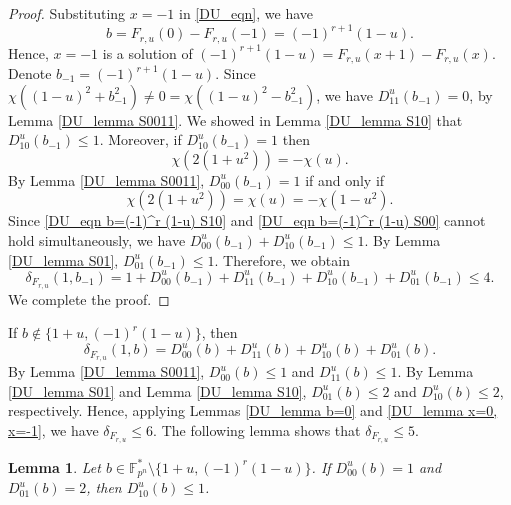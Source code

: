 \documentclass[11pt]{article}
\numberwithin{theorem}{section}
\newtheorem{lemma}[theorem]{Lemma}
\newcommand{\Fpnmul}{\mathbb{F}_{p^n}^*}
\begin{document}
\begin{proof}
	Substituting $x=-1$ in \eqref{DU_eqn}, we have
	\begin{equation*}
		b=F_{r,u}(0)-F_{r,u}(-1) = (-1)^{r+1}(1-u).
	\end{equation*}
	Hence, $x=-1$ is a solution of $(-1)^{r+1}(1-u) = F_{r,u}(x+1)-F_{r,u}(x)$. Denote $b_{-1} =(-1)^{r+1}(1-u)$. Since $\chi((1-u)^2+b_{-1}^2)\ne 0 =\chi((1-u)^2-b_{-1}^2)$, we have $D_{11}^u(b_{-1})=0$, by Lemma \ref{DU_lemma S0011}. 
	We showed in Lemma \ref{DU_lemma S10} that $D_{10}^u(b_{-1}) \le 1$. Moreover,  if $D_{10}^u(b_{-1})=1$ then 
	\begin{equation}\label{DU_eqn b=(-1)^r (1-u) S10}
		\chi(2(1+u^2))=-\chi(u).
	\end{equation}
	By Lemma \ref{DU_lemma S0011}, $D_{00}^u(b_{-1})=1$ if and only if 
	\begin{equation}\label{DU_eqn b=(-1)^r (1-u) S00}
		\chi(2(1+ u^2))=\chi(u)=-\chi(1-u^2).
	\end{equation}
	Since \eqref{DU_eqn b=(-1)^r (1-u) S10} and \eqref{DU_eqn b=(-1)^r (1-u) S00} cannot hold simultaneously, we have $D_{00}^u(b_{-1})+D_{10}^u(b_{-1})\le 1$. By Lemma \ref{DU_lemma S01}, $D_{01}^u(b_{-1})\le 1$. 
	Therefore, we obtain 
	\begin{equation*}
		\delta_{F_{r,u}}(1,b_{-1})=1+D_{00}^u(b_{-1}) + D_{11}^u(b_{-1})
		+D_{10}^u(b_{-1})+D_{01}^u(b_{-1})\le 4.
	\end{equation*}
	We complete the proof.
\end{proof}

If $b\not \in \{1+u, (-1)^r(1-u)\}$, then 
\begin{equation}\label{DU_formula}
	\delta_{F_{r,u}}(1,b)=D_{00}^u(b)+D_{11}^u(b)+D_{10}^u(b)+D_{01}^u(b).
\end{equation}
By Lemma \ref{DU_lemma S0011}, $D_{00}^u(b)\le 1$ and $D_{11}^u(b)\le 1$. By Lemma \ref{DU_lemma S01} and Lemma \ref{DU_lemma S10}, $D_{01}^u(b)\le 2$ and $D_{10}^u(b)\le 2$, respectively. Hence, applying Lemmas \ref{DU_lemma b=0} and \ref{DU_lemma x=0, x=-1}, we have $\delta_{F_{r,u}}\le 6$. The following lemma shows that $\delta_{F_{r,u}}\le 5$.

\begin{lemma}\label{DU5_lemma}
	Let $b\in \Fpnmul\setminus  \{1+u, (-1)^r(1-u)\}$. If $D_{00}^u(b)=1$ and $D_{01}^u(b)=2$, then $D_{10}^u(b)\le 1$. 
\end{lemma}
\end{document}
